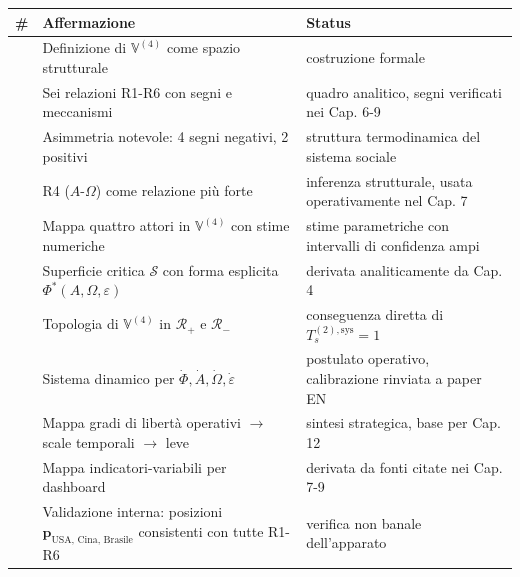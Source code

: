 {\def\LTcaptype{none} %
{\small\begin{longtable}[]{@{}
  >{\raggedright\arraybackslash}p{}
  >{\raggedright\arraybackslash}p{}
  >{\raggedright\arraybackslash}p{}@{}}
\toprule\noalign{}
\begin{minipage}[b]{\linewidth}\raggedright
\#
\end{minipage} & \begin{minipage}[b]{\linewidth}\raggedright
Affermazione
\end{minipage} & \begin{minipage}[b]{\linewidth}\raggedright
Status
\end{minipage} \\
\midrule\noalign{}
\endhead
\bottomrule\noalign{}
\endlastfoot
1 & Definizione di \(\mathbb{V}^{(4)}\) come spazio strutturale &
\Hypoth{} costruzione formale \\
2 & Sei relazioni R1-R6 con segni e meccanismi & \Hypoth{} quadro
analitico, segni verificati nei Cap. 6-9 \\
3 & Asimmetria notevole: 4 segni negativi, 2 positivi & \Proved{}
struttura termodinamica del sistema sociale \\
4 & R4 (\(A\)-\(\Omega\)) come relazione più forte & \Hypoth{} inferenza
strutturale, usata operativamente nel Cap. 7 \\
5 & Mappa quattro attori in \(\mathbb{V}^{(4)}\) con stime numeriche &
\Conj{} stime parametriche con intervalli di confidenza ampi \\
6 & Superficie critica \(\mathcal{S}\) con forma esplicita
\(\Phi^*(A, \Omega, \varepsilon)\) & \Proved{} derivata analiticamente
da Cap. 4 \\
7 & Topologia di \(\mathbb{V}^{(4)}\) in \(\mathcal{R}_+\) e
\(\mathcal{R}_-\) & \Proved{} conseguenza diretta di
\(T_s^{(2),\text{sys}} = 1\) \\
8 & Sistema dinamico per
\(\dot\Phi, \dot A, \dot\Omega, \dot\varepsilon\) & \Hypoth{} postulato
operativo, calibrazione rinviata a paper EN \\
9 & Mappa gradi di libertà operativi \(\to\) scale temporali \(\to\)
leve & \Hypoth{} sintesi strategica, base per Cap. 12 \\
10 & Mappa indicatori-variabili per dashboard & \Proved{} derivata da
fonti citate nei Cap. 7-9 \\
11 & Validazione interna: posizioni
\(\boldsymbol{p}_{\text{USA, Cina, Brasile}}\) consistenti con tutte
R1-R6 & \Proved{} verifica non banale dell'apparato \\
\end{longtable}}
}



